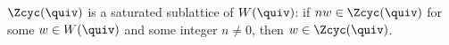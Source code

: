 \begin{proposition}[Saturation]\label{sh-0007}
$\Zcyc(\quiv)$ is a saturated sublattice of $W(\quiv)$: if $n w \in \Zcyc(\quiv)$ for some $w \in W(\quiv)$ and some integer $n \neq 0$, then $w \in \Zcyc(\quiv)$.
\end{proposition}
